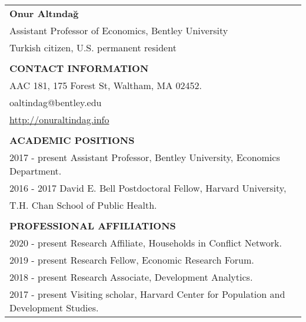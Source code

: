 \documentclass[12 pt]{article}
\begin{document}
\begin{longtable}{ccccc}



\multicolumn{5}{l}{\Large{\textbf{Onur Alt{\i}nda\u{g}}}}     \\


\multicolumn{5}{l}{Assistant Professor of Economics, Bentley University}    \\
\multicolumn{5}{l}{Turkish citizen, U.S. permanent resident}    \\

\\
\multicolumn{5}{l}{\textbf{CONTACT INFORMATION}} \\[2 pt]
\multicolumn{5}{l}{AAC 181, 175 Forest St, Waltham, MA 02452.}    \\
\multicolumn{5}{l}{oaltindag@bentley.edu}   \\
\multicolumn{5}{l}{\url{http://onuraltindag.info}}   \\



\\
\multicolumn{5}{l}{\textbf{ACADEMIC POSITIONS}}  \\[2 pt]
 \multicolumn{4}{l}{2017 - present \phantom{00} Assistant Professor, Bentley University, Economics Department.}  \\
 \multicolumn{4}{l}{2016 - 2017 \phantom{0000} David E. Bell Postdoctoral Fellow, Harvard University,}  \\
  \multicolumn{4}{l}{\phantom{2016 - 2017} \phantom{0000}  T.H. Chan School of Public Health.}  \\

\\

 \multicolumn{5}{l}{\textbf{PROFESSIONAL AFFILIATIONS}}  \\[2 pt]


 \multicolumn{4}{l}{2020 - present \phantom{00}Research Affiliate, Households in Conflict Network.}  \\
 \multicolumn{4}{l}{2019 - present \phantom{00}Research Fellow, Economic Research Forum.}  \\
 \multicolumn{4}{l}{2018 - present \phantom{00}Research Associate, Development Analytics.}  \\
 \multicolumn{4}{l}{2017 - present \phantom{00}Visiting scholar, Harvard Center for Population and Development Studies.} \\ 


\end{longtable}
\end{document}
